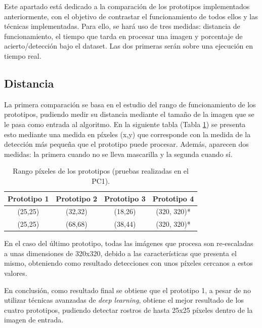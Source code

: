 Este apartado está dedicado a la comparación de los prototipos implementados anteriormente, con el objetivo de contrastar el funcionamiento de todos ellos y las técnicas implementadas. Para ello, se hará uso de tres medidas: distancia de funcionamiento, el tiempo que tarda en procesar una imagen y porcentaje de acierto/detección bajo el dataset. Las dos primeras serán sobre una ejecución en tiempo real.

\vspace{-0.7cm}
\subsection*{Distancia}
\vspace{-0.5cm}
La primera comparación se basa en el estudio del rango de funcionamiento de los prototipos, pudiendo medir su distancia mediante el tamaño de la imagen que se le pasa como entrada al algoritmo. En la siguiente tabla (Tabla \ref{tab:table3}) se presenta esto mediante una medida en píxeles (x,y) que corresponde con la medida de la detección más pequeña que el prototipo puede procesar. Además, aparecen dos medidas: la primera cuando no se lleva mascarilla y la segunda cuando sí.

\begin{table}[h!]
	\begin{center}
		\begin{tabular}{ |c|c|c|c| } 
			\hline
			\textbf{Prototipo 1} & \textbf{Prototipo 2} & \textbf{Prototipo 3} & \textbf{Prototipo 4} \\
			\hline
			(25,25) & (32,32)  & (18,26) & (320, 320)* \\
			(25,25) & (68,68)  & (38,44) & (320, 320)* \\
			\hline
		\end{tabular}
		\caption{Rango píxeles de los prototipos (pruebas realizadas en el PC1).}
		\label{tab:table3}
	\end{center}
\end{table}

En el caso del último prototipo, todas las imágenes que procesa son re-escaladas a unas dimensiones de 320x320, debido a las características que presenta el mismo, obteniendo como resultado detecciones con unos píxeles cercanos a estos valores.

En conclusión, como resultado final se obtiene que el prototipo 1, a pesar de no utilizar técnicas avanzadas de \textit{deep learning}, obtiene el mejor resultado de los cuatro prototipos, pudiendo detectar rostros de hasta 25x25 píxeles dentro de la imagen de entrada.

